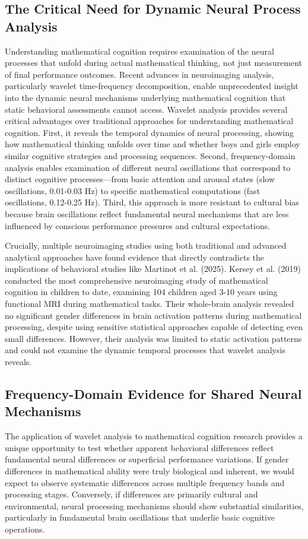 \documentclass[12pt, a4paper]{article}
\begin{document}
\subsection{The Critical Need for Dynamic Neural Process Analysis}
Understanding mathematical cognition requires examination of the neural processes that unfold during actual mathematical thinking, not just measurement of final performance outcomes. Recent advances in neuroimaging analysis, particularly wavelet time-frequency decomposition, enable unprecedented insight into the dynamic neural mechanisms underlying mathematical cognition that static behavioral assessments cannot access.
Wavelet analysis provides several critical advantages over traditional approaches for understanding mathematical cognition. First, it reveals the temporal dynamics of neural processing, showing how mathematical thinking unfolds over time and whether boys and girls employ similar cognitive strategies and processing sequences. Second, frequency-domain analysis enables examination of different neural oscillations that correspond to distinct cognitive processes—from basic attention and arousal states (slow oscillations, 0.01-0.03 Hz) to specific mathematical computations (fast oscillations, 0.12-0.25 Hz). Third, this approach is more resistant to cultural bias because brain oscillations reflect fundamental neural mechanisms that are less influenced by conscious performance pressures and cultural expectations.

Crucially, multiple neuroimaging studies using both traditional and advanced analytical approaches have found evidence that directly contradicts the implications of behavioral studies like Martinot et al. (2025). Kersey et al. (2019) conducted the most comprehensive neuroimaging study of mathematical cognition in children to date, examining 104 children aged 3-10 years using functional MRI during mathematical tasks. Their whole-brain analysis revealed no significant gender differences in brain activation patterns during mathematical processing, despite using sensitive statistical approaches capable of detecting even small differences. However, their analysis was limited to static activation patterns and could not examine the dynamic temporal processes that wavelet analysis reveals.


\subsection{Frequency-Domain Evidence for Shared Neural Mechanisms}
The application of wavelet analysis to mathematical cognition research provides a unique opportunity to test whether apparent behavioral differences reflect fundamental neural differences or superficial performance variations. If gender differences in mathematical ability were truly biological and inherent, we would expect to observe systematic differences across multiple frequency bands and processing stages. Conversely, if differences are primarily cultural and environmental, neural processing mechanisms should show substantial similarities, particularly in fundamental brain oscillations that underlie basic cognitive operations.
\end{document}

